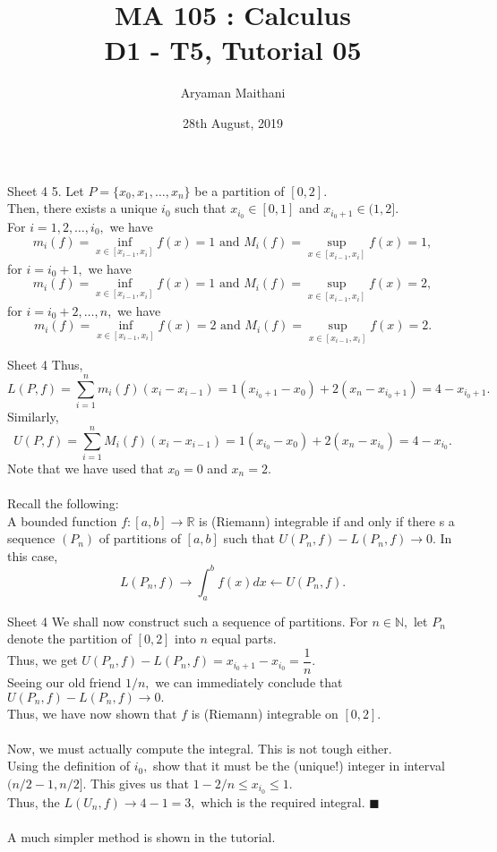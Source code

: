 \documentclass[handout, aspectratio=169]{beamer}
\title{MA 105 : Calculus\\ D1 - T5, Tutorial 05}  %
\author{Aryaman Maithani}
\date[28-08-2019]{28th August, 2019}               %
\institute[IITB]{IIT Bombay}
\begin{document}
\begin{frame}
	\titlepage
\end{frame}
\begin{frame}{Sheet 4}                            %
	5. Let $P = \{x_0, x_1, \ldots, x_n\}$ be a partition of $[0, 2].$\\
	Then, there exists a unique $i_0$ such that $x_{i_0} \in [0, 1]$ and $x_{i_0 + 1} \in (1, 2].$\\
	For $i = 1, 2, \ldots, i_0,$ we have
	\[m_i(f) = \inf_{x \in [x_{i-1}, x_i]} f(x) = 1 \text{ and } M_i(f) = \sup_{x \in [x_{i-1}, x_i]}f(x) = 1,\]
	for $i = i_0 + 1,$ we have
	\[m_i(f) = \inf_{x \in [x_{i-1}, x_i]} f(x) = 1 \text{ and } M_i(f) = \sup_{x \in [x_{i-1}, x_i]}f(x) = 2,\]
	for $i = i_0 + 2, \ldots, n,$ we have
	\[m_i(f) = \inf_{x \in [x_{i-1}, x_i]} f(x) = 2 \text{ and } M_i(f) = \sup_{x \in [x_{i-1}, x_i]}f(x) = 2.\]
\end{frame}
\begin{frame}{Sheet 4}
	Thus,
	\[L(P, f) = \sum_{i=1}^{n}m_i(f)(x_i - x_{i-1}) = 1(x_{i_0 + 1} - x_0) + 2(x_n - x_{i_0 + 1}) = 4 - x_{i_0 + 1}.\]
	Similarly,
	\[U(P, f) = \sum_{i=1}^{n}M_i(f)(x_i - x_{i-1}) = 1(x_{i_0} - x_0) + 2(x_n - x_{i_0}) = 4 - x_{i_0}.\]
	Note that we have used that $x_0 = 0$ and $x_n = 2.$\\~\\
	Recall the following:\\
	A bounded function $f:[a, b] \to \mathbb{R}$ is (Riemann) integrable if and only if there s a sequence $(P_n)$ of partitions of $[a, b]$ such that $U(P_n, f) - L(P_n, f) \to 0.$ In this case,
	\[L(P_n, f) \to \int_{a}^{b} f(x) dx \leftarrow U(P_n, f).\]
	
\end{frame}
\begin{frame}{Sheet 4}
	We shall now construct such a sequence of partitions. For $n \in \mathbb{N},$ let $P_n$ denote the partition of $[0, 2]$ into $n$ equal parts.\\
	Thus, we get $U(P_n, f) - L(P_n, f) = x_{i_0 + 1} - x_{i_0} = \dfrac{1}{n}.$\\
	Seeing our old friend $1/n,$ we can immediately conclude that $U(P_n, f) - L(P_n, f) \to 0.$\\
	Thus, we have now shown that $f$ is (Riemann) integrable on $[0, 2].$\\~\\
	Now, we must actually compute the integral. This is not tough either.\\
	Using the definition of $i_0,$ show that it must be the (unique!) integer in interval $(n/2 - 1, n/2].$ This gives us that $1 - 2/n \le x_{i_0} \le 1.$\\
	Thus, the $L(U_n, f) \to 4-1 = 3,$ which is the required integral. \hfill $\blacksquare$\\~\\
	A much simpler method is shown in the tutorial.
\end{frame}
\end{document}

